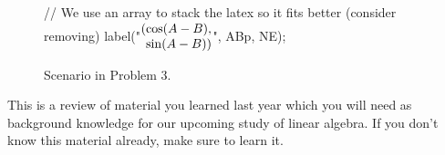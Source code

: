 \documentclass[../textbook.tex]{subfiles}
\begin{document}
\begin{figure}[h]
\begin{center}
\begin{minipage}[b]{\textwidth}
\begin{asy}[width=0.5\textwidth]
				// We use an array to stack the latex so it fits better (consider removing)
				label("$\arraycolsep=0pt \begin{array}{rl} (& \cos (A-B), \\ & \sin (A-B)) \end{array}$", ABp, NE);
			\end{asy}
		\end{minipage}
	\end{center}
	\vspace*{-2\baselineskip}
	\begin{center}
		\begin{minipage}[t]{\textwidth}
			\caption{Scenario in Problem 3.}
			\label{fig:unit_circle}
		\end{minipage}\hfill
	\end{center}
	\vspace*{-2\baselineskip}
\end{figure}

\noindent This is a review of material you learned last year which you will need as background knowledge for our upcoming study of linear algebra. If you don't know this material already, make sure to learn it.
\end{document}
